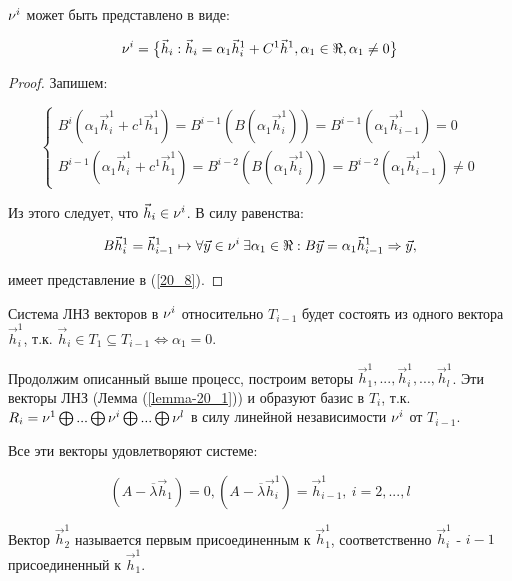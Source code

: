 \documentclass[a4paper, 12pt]{article}
\begin{document}
\begin{proposition}
$\nu^i$ может быть представлено в виде: 

\begin{equation}\label{20_8}
\nu^i = \big\lbrace \vec{h}_i: \vec{h}_i = \alpha_1 \vec{h}_i^1 + C^1 \vec{h}^1, \alpha_1 \in \Re , \alpha_1 \neq 0 \big\rbrace
\end{equation}

\begin{proof}

Запишем:

\begin{equation*}
\begin{cases}
B^i ( \alpha_1\vec{h}_i^1 + c^1 \vec{h}_1^1) = B^{i - 1} (B(\alpha_1 \vec{h}_i^1 )) = B^{i - 1} (\alpha_1 \vec{h}_{i-1}^1) = 0 \\
B^{i-1} ( \alpha_1\vec{h}_i^1 + c^1 \vec{h}_1^1) = B^{i - 2} (B(\alpha_1 \vec{h}_i^1 )) = B^{i - 2} (\alpha_1 \vec{h}_{i-1}^1) \neq 0
\end{cases}
\end{equation*}

Из этого следует, что $\vec{h}_i \in \nu^i$. В силу равенства:

\[B\vec{h}_i^1 = \vec{h}_{i-1}^1 \mapsto \forall \vec{y} \in \nu^i \: \exists \alpha_1 \in \Re : B\vec{y} = \alpha_1\vec{h}_{i-1}^1 \Rightarrow \vec{y},\]

имеет представление в (\ref{20_8}).
\end{proof}
\end{proposition}

Система ЛНЗ векторов в $\nu^i$ относительно $T_{i-1}$ будет состоять из одного вектора $\vec{h}_i^1$, т.к. $\vec{h}_i \in T_1 \subseteq T_{i - 1} \Leftrightarrow \alpha_1 = 0$.

Продолжим описанный выше процесс, построим веторы $\vec{h}_1^1, ... , \vec{h}_i^1 , ... , \vec{h}_l^1$. Эти векторы ЛНЗ (Лемма (\ref{lemma-20_1})) и образуют базис в $T_i$, т.к. $R_i = \nu^1 \bigoplus ... \bigoplus \nu^i \bigoplus ... \bigoplus \nu^l$ в силу линейной независимости $\nu^i$ от $T_{i - 1}$.

Все эти векторы удовлетворяют системе:

\begin{equation}\label{20_9}
(A - \overline{\lambda} \vec{h}_1) = 0, (A - \overline{\lambda} \vec{h}_i^1) = \vec{h}_{i-1}^1, \: i = 2,...,l 
\end{equation}

Вектор $\vec{h}_2^1$ называется первым присоединенным к $\vec{h}_1^1$, соответственно $\vec{h}_i^1$ - $i-1$ присоединенный к $\vec{h}_1^1$.
\end{document}
